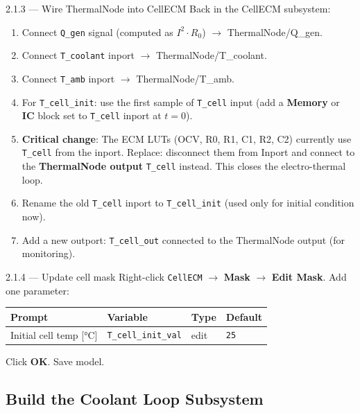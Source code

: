 \documentclass[11pt,a4paper]{article}
\begin{document}
\begin{guistep}{2.1.3 — Wire ThermalNode into CellECM}
Back in the CellECM subsystem:
\begin{enumerate}
    \item Connect \texttt{Q\_gen} signal (computed as $I^2 \cdot R_0$) $\to$ ThermalNode/Q\_gen.
    \item Connect \texttt{T\_coolant} inport $\to$ ThermalNode/T\_coolant.
    \item Connect \texttt{T\_amb} inport $\to$ ThermalNode/T\_amb.
    \item For \texttt{T\_cell\_init}: use the first sample of \texttt{T\_cell} input (add a \textbf{Memory} or \textbf{IC} block set to \texttt{T\_cell} inport at $t=0$).
    \item \textbf{Critical change}: The ECM LUTs (OCV, R0, R1, C1, R2, C2) currently use \texttt{T\_cell} from the inport. Replace: disconnect them from Inport and connect to the \textbf{ThermalNode output} \texttt{T\_cell} instead. This closes the electro-thermal loop.
    \item Rename the old \texttt{T\_cell} inport to \texttt{T\_cell\_init} (used only for initial condition now).
    \item Add a new outport: \texttt{T\_cell\_out} connected to the ThermalNode output (for monitoring).
\end{enumerate}
\end{guistep}

\begin{guistep}{2.1.4 — Update cell mask}
Right-click \texttt{CellECM} $\to$ \textbf{Mask} $\to$ \textbf{Edit Mask}. Add one parameter:
\begin{center}
\begin{tabular}{llll}
    \toprule
    \textbf{Prompt} & \textbf{Variable} & \textbf{Type} & \textbf{Default} \\
    \midrule
    Initial cell temp [\si{\degreeCelsius}] & \texttt{T\_cell\_init\_val} & edit & \texttt{25} \\
    \bottomrule
\end{tabular}
\end{center}
Click \textbf{OK}. Save model.
\end{guistep}

\subsection{Build the Coolant Loop Subsystem}
\end{document}
